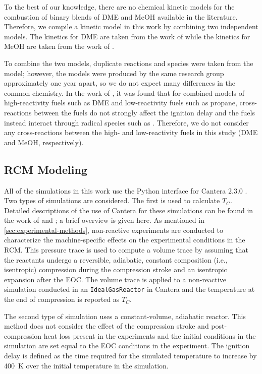 \documentclass[12pt]{ussci}
\begin{document}
To the best of our knowledge, there are no chemical kinetic models for the
combustion of binary blends of DME and MeOH available in the literature.
Therefore, we compile a kinetic model in this work by combining two independent
models. The kinetics for DME are taken from the work of \textcite{Burke2015a}
while the kinetics for MeOH are taken from the work of \textcite{Burke2016}.

To combine the two models, duplicate reactions and species were taken from the
\textcite{Burke2015a} model; however, the models were produced by the same
research group approximately one year apart, so we do not expect many
differences in the common chemistry. In the work of \textcite{Dames2016}, it was
found that for combined models of high-reactivity fuels such as DME and
low-reactivity fuels such as propane, cross-reactions between the fuels do not
strongly affect the ignition delay and the fuels instead interact through
radical species such as . Therefore, we do not consider any
cross-reactions between the high- and low-reactivity fuels in this study (DME
and MeOH, respectively).

\subsection{RCM Modeling}\label{sec:rcm-modeling}

All of the simulations in this work use the Python interface for Cantera 2.3.0
\autocite{cantera}. Two types of simulations are considered. The first is used
to calculate \(T_C\). Detailed descriptions of the use of Cantera for these
simulations can be found in the work of \textcite{Weber2016a} and
\textcite{Dames2016}; a brief overview is given here. As mentioned in
\cref{sec:experimental-methods}, non-reactive experiments are conducted to
characterize the machine-specific effects on the experimental conditions in the
RCM. This pressure trace is used to compute a volume trace by assuming that the
reactants undergo a reversible, adiabatic, constant composition (i.e.,
isentropic) compression during the compression stroke and an isentropic
expansion after the EOC. The volume trace is applied to a non-reactive
simulation conducted in an \verb|IdealGasReactor| in Cantera \autocite{cantera}
and the temperature at the end of compression is reported as \(T_C\).

The second type of simulation uses a constant-volume, adiabatic reactor. This
method does not consider the effect of the compression stroke and
post-compression heat loss present in the experiments and the initial conditions
in the simulation are set equal to the EOC conditions in the experiment. The
ignition delay is defined as the time required for the simulated temperature to
increase by \SI{400}{\K} over the initial temperature in the simulation.
\end{document}
